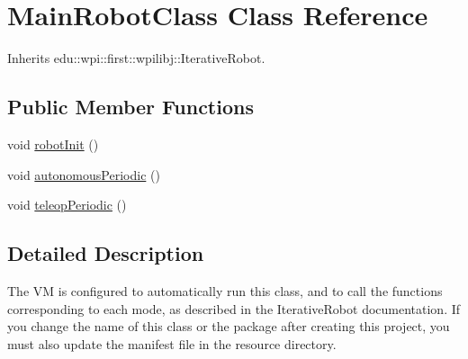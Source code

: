 \hypertarget{classorg_1_1usfirst_1_1frc3729_1_1_main_robot_class}{
\section{MainRobotClass Class Reference}
\label{classorg_1_1usfirst_1_1frc3729_1_1_main_robot_class}
}


Inherits edu::wpi::first::wpilibj::IterativeRobot.

\subsection*{Public Member Functions}
\begin{DoxyCompactItemize}
\item 
void \hyperlink{classorg_1_1usfirst_1_1frc3729_1_1_main_robot_class_a8ecb7e2f7f61f8fdd2dfe6b19cb33e6b}{robotInit} ()
\item 
void \hyperlink{classorg_1_1usfirst_1_1frc3729_1_1_main_robot_class_ad1890d14437760dd78cf0d806b8ed181}{autonomousPeriodic} ()
\item 
void \hyperlink{classorg_1_1usfirst_1_1frc3729_1_1_main_robot_class_a8fdc05f41fb5dcb2a22be5aaec03d59b}{teleopPeriodic} ()
\end{DoxyCompactItemize}


\subsection{Detailed Description}
The VM is configured to automatically run this class, and to call the functions corresponding to each mode, as described in the IterativeRobot documentation. If you change the name of this class or the package after creating this project, you must also update the manifest file in the resource directory. 

